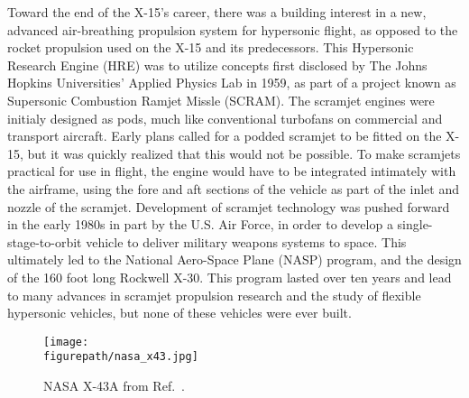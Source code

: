 Toward the end of the X-15's career, there was a building interest in a new, advanced air-breathing propulsion system for hypersonic flight, as opposed to the rocket propulsion used on the X-15 and its predecessors.
This Hypersonic Research Engine (HRE) was to utilize concepts first disclosed by The Johns Hopkins Universities' Applied Physics Lab in 1959, as part of a project known as Supersonic Combustion Ramjet Missle (SCRAM).
The scramjet engines were initialy designed as pods, much like conventional turbofans on commercial and transport aircraft.
Early plans called for a podded scramjet to be fitted on the X-15, but it was quickly realized that this would not be possible.
To make scramjets practical for use in flight, the engine would have to be integrated intimately with the airframe, using the fore and aft sections of the vehicle as part of the inlet and nozzle of the scramjet.
Development of scramjet technology was pushed forward in the early 1980s in part by the U.S. Air Force, in order to develop a single-stage-to-orbit vehicle to deliver military weapons systems to space.
This ultimately led to the National Aero-Space Plane (NASP) program, and the design of the 160 foot long Rockwell X-30.
This program lasted over ten years and lead to many advances in scramjet propulsion research and the study of flexible hypersonic vehicles, but none of these vehicles were ever built.

\begin{figure}[h]
  \begin{center}
    \texttt{[image: \\figurepath/nasa\_x43.jpg]}
    \caption{NASA X-43A from Ref.\ \cite{x43picture}.}
  \end{center}
\end{figure}


